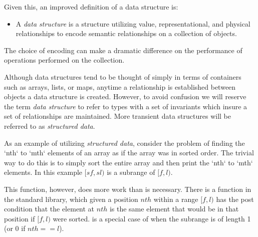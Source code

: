 Given this, an improved definition of a data structure is:

\begin{itemize}
\item A \textit{data structure} is a structure utilizing value, representational, and physical relationships to encode semantic relationships on a collection of objects.
\end{itemize}


The choice of encoding can make a dramatic difference on the performance of operations performed on the collection.


Although data structures tend to be thought of simply in terms of containers such as arrays, lists, or maps, anytime a relationship is established between objects a data structure is created. However, to avoid confusion we will reserve the term \textit{data structure} to refer to types with a set of invariants which insure a set of relationships are maintained. More transient data structures will be referred to as \textit{structured data}.

As an example of utilizing \textit{structured data}, consider the problem of finding the `nth` to `mth` elements of an array as if the array was in sorted order. The trivial way to do this is to simply sort the entire array and then print the `nth` to `mth` elements. In this example $[sf, sl)$ is a subrange of $[f, l)$. 

\begin{minipage}{\linewidth}
	
\end{minipage}



This function, however, does more work than is necessary. 
There is a function in the standard library,  which given a position $nth$ within a range $[f, l)$ has the post condition that the element at $nth$ is the same element that would be in that position if $[f, l)$ were sorted.  is a special case of  when the subrange is of length 1 (or 0 if $nth == l$).

